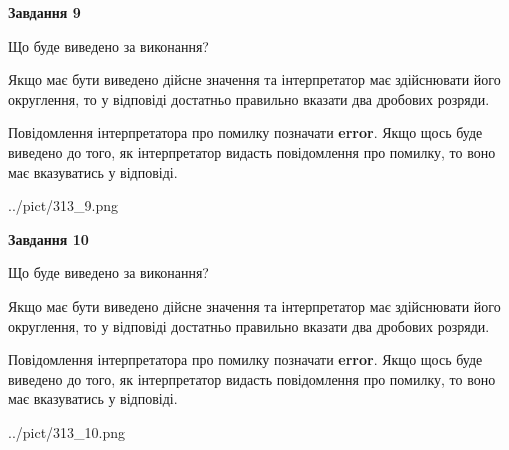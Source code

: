 \documentclass[12pt, ukrainian]{article}
\begin{document}
{\begin {Large}
{\begin {center}\textbf{Завдання 9}\end {center}}\par
Що буде виведено за виконання? \par

Якщо має бути виведено дійсне значення та інтерпретатор має здійснювати його округлення, 
то у відповіді достатньо правильно вказати два дробових розряди.

Повідомлення інтерпретатора про помилку позначати \textbf{error}.
Якщо щось буде виведено до того, як інтерпретатор видасть повідомлення про помилку, 
то воно має вказуватись у відповіді. \par

\begin{center}
	{../pict/313_9.png}
\end{center}
\newpage

{\begin {center}\textbf{Завдання 10}\end {center}}\par
Що буде виведено за виконання? \par

Якщо має бути виведено дійсне значення та інтерпретатор має здійснювати його округлення, 
то у відповіді достатньо правильно вказати два дробових розряди.

Повідомлення інтерпретатора про помилку позначати \textbf{error}.
Якщо щось буде виведено до того, як інтерпретатор видасть повідомлення про помилку, 
то воно має вказуватись у відповіді. \par

\begin{center}
	{../pict/313_10.png}
\end{center}
\newpage

\end {Large}}
\end{document}
